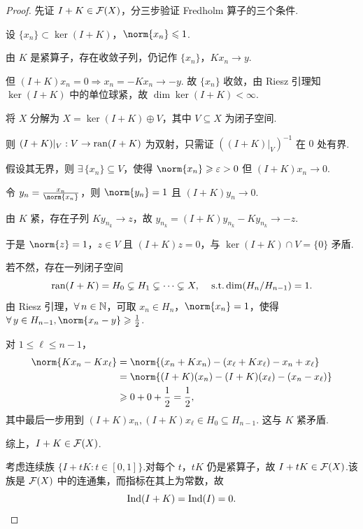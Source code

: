 \begin{proof}
先证 $I+K\in\mathcal{F}(X)$，分三步验证 Fredholm 算子的三个条件.\par
{} 设 $\{x_n\} \subset \ker(I+K)$，$\norm{x_n}\leq 1$.\par
由 $K$ 是紧算子，存在收敛子列，仍记作 $\{x_n\}$，$Kx_n \to y$. \par
但 $(I+K)x_n = 0 \Rightarrow x_n = -Kx_n \to -y$. 故 $\{x_n\}$ 收敛，由 Riesz 引理知 $\ker(I+K)$ 中的单位球紧，故 $\dim\ker(I+K) < \infty$.\par
{} 将 $X$ 分解为 $X = \ker(I+K) \oplus V$，其中 $V \subseteq X$ 为闭子空间. \par
则 $(I+K)|_V: V \to \operatorname{ran}(I+K)$ 为双射，只需证 $((I+K)|_V)^{-1}$ 在 $0$ 处有界.\par
假设其无界，则 $\exists\,\{x_n\} \subseteq V$，使得 $\norm{x_n} \geq \varepsilon > 0$ 但 $(I+K)x_n \to 0$.\par
令 $y_n = \frac{x_n}{\norm{x_n}}$，则 $\norm{y_n}=1$ 且 $(I+K)y_n \to 0$.\par
由 $K$ 紧，存在子列 $Ky_{n_k} \to z$，故 $y_{n_k} = (I+K)y_{n_k} - Ky_{n_k} \to -z$.\par
于是 $\norm{z}=1$，$z \in V$ 且 $(I+K)z = 0$，与 $\ker(I+K) \cap V = \{0\}$ 矛盾.\par
{} 若不然，存在一列闭子空间
\begin{equation*}
\operatorname{ran}(I+K) = H_0 \subsetneq H_1 \subsetneq \cdots \subsetneq X,\quad \operatorname{\,\text{s.t.}} \dim(H_{n}/H_{n-1}) = 1.
\end{equation*}
由 Riesz 引理，$\forall\, n\in\mathbb{N}$，可取 $x_n \in H_n$，$\norm{x_n}=1$，使得 $\forall\, y \in H_{n-1},\norm{x_n - y} \geq \frac{1}{2}$.\par
对 $1 \leq \ell \leq n-1$，
\begin{align*}
\norm{Kx_n - Kx_\ell}
&= \norm{(x_n+Kx_n) - (x_\ell+Kx_\ell) - x_n + x_\ell}\\
&= \norm{(I+K)(x_n) - (I+K)(x_\ell) - (x_n-x_\ell)}\\
&\geq 0+0+\frac{1}{2}=\frac{1}{2},
\end{align*}
其中最后一步用到 $(I+K)x_n, (I+K)x_\ell \in H_0 \subseteq H_{n-1}$. 这与 $K$ 紧矛盾.\par
综上，$I+K \in \mathcal{F}(X)$.\par
考虑连续族 $\{I + tK: t\in[0,1]\}$.对每个 $t$，$tK$ 仍是紧算子，故 $I+tK\in\mathcal{F}(X)$.该族是 $\mathcal{F}(X)$ 中的连通集，而指标在其上为常数，故
\begin{equation*}
\operatorname{Ind}(I+K) = \operatorname{Ind}(I) = 0.\qedhere
\end{equation*}
\end{proof}

